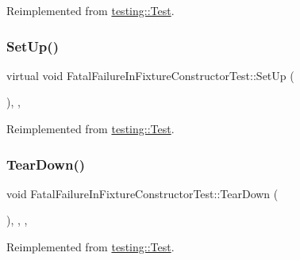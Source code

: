 Reimplemented from \mbox{\hyperlink{classtesting_1_1_test_a190315150c303ddf801313fd1a777733}{testing\+::\+Test}}.

\mbox{\label{class_fatal_failure_in_fixture_constructor_test_a006d3ac0e7a4ad3c469c3b41dc7c42c3}} 
\subsubsection{\texorpdfstring{SetUp()}{SetUp()}\hspace{0.1cm}{\footnotesize\ttfamily [3/3]}}
{\footnotesize\ttfamily virtual void Fatal\+Failure\+In\+Fixture\+Constructor\+Test\+::\+Set\+Up (\begin{DoxyParamCaption}{ }\end{DoxyParamCaption})\hspace{0.3cm}{\ttfamily [inline]}, {\ttfamily [protected]}, {\ttfamily [virtual]}}



Reimplemented from \mbox{\hyperlink{classtesting_1_1_test_a190315150c303ddf801313fd1a777733}{testing\+::\+Test}}.

\mbox{\label{class_fatal_failure_in_fixture_constructor_test_a533465f7e241d56cb21ec11aa94f1908}} 
\subsubsection{\texorpdfstring{TearDown()}{TearDown()}\hspace{0.1cm}{\footnotesize\ttfamily [1/3]}}
{\footnotesize\ttfamily void Fatal\+Failure\+In\+Fixture\+Constructor\+Test\+::\+Tear\+Down (\begin{DoxyParamCaption}{ }\end{DoxyParamCaption})\hspace{0.3cm}{\ttfamily [inline]}, {\ttfamily [override]}, {\ttfamily [protected]}, {\ttfamily [virtual]}}



Reimplemented from \mbox{\hyperlink{classtesting_1_1_test_a5f0ab439802cbe0ef7552f1a9f791923}{testing\+::\+Test}}.

